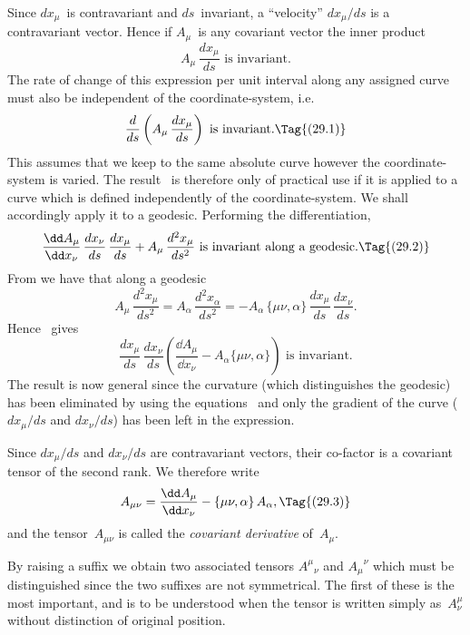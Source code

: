 \documentclass[12pt]{book}
\begin{document}
Since $dx_{\mu}$~is contravariant and $ds$~invariant, a ``velocity'' $dx_{\mu}/ds$ is a
contravariant vector. Hence if $A_{\mu}$~is any covariant vector the inner product
\[
A_{\mu}\, \frac{dx_{\mu}}{ds} \text{ is invariant.}
\]
The rate of change of this expression per unit interval along any assigned
curve must also be independent of the coordinate-system, i.e.\
\[
\frac{d}{ds} \left(A_{\mu}\, \frac{dx_{\mu}}{ds}\right)
\text{ is invariant.}
\Tag{(29.1)}
\]
This assumes that we keep to the same absolute curve however the coordinate-system
is varied. The result~\Eq{(29.1)} is therefore only of practical use if it is
applied to a curve which is defined independently of the coordinate-system.
We shall accordingly apply it to a geodesic. Performing the differentiation,
\[
\frac{\dd A_{\mu}}{\dd x_{\nu}}\, \frac{dx_{\nu}}{ds}\, \frac{dx_{\mu}}{ds}
+ A_{\mu}\, \frac{d^{2}x_{\mu}}{ds^{2}} \text{ is invariant along a geodesic.}
\Tag{(29.2)}
\]
From  we have that along a geodesic
\[
A_{\mu}\, \frac{d^{2}x_{\mu}}{ds^{2}} = A_{\alpha}\, \frac{d^{2}x_{\alpha}}{ds^{2}}
= -A_{\alpha}\, \{\mu\nu, \alpha\}\, \frac{dx_{\mu}}{ds}\, \frac{dx_{\nu}}{ds}.
\]
Hence ~gives
\[
\frac{dx_{\mu}}{ds}\, \frac{dx_{\nu}}{ds} \left(\frac{\dd A_{\mu}}{\dd x_{\nu}} - A_{\alpha} \{\mu\nu, \alpha\}\right) \text{ is invariant.}
\]
The result is now general since the curvature (which distinguishes the
geodesic) has been eliminated by using the equations~\Eq{(28.5)} and only the
gradient of the curve ($dx_{\mu}/ds$ and $dx_{\nu}/ds$) has been left in the expression.

Since $dx_{\mu}/ds$ and $dx_{\nu}/ds$ are contravariant vectors, their co-factor is a
covariant tensor of the second rank. We therefore write
\[
A_{\mu\nu} = \frac{\dd A_{\mu}}{\dd x_{\nu}} - \{\mu\nu, \alpha\}\, A_{\alpha},
\Tag{(29.3)}
\]
and the tensor~$A_{\mu\nu}$ is called the \emph{covariant derivative} of~$A_{\mu}$.

By raising a suffix we obtain two associated tensors ${A^{\mu}}_{\nu}$ and ${A_{\mu}}^{\nu}$ which
must be distinguished since the two suffixes are not symmetrical. The first
of these is the most important, and is to be understood when the tensor
is written simply as~$A_{\nu}^{\mu}$ without distinction of original position.
\end{document}
